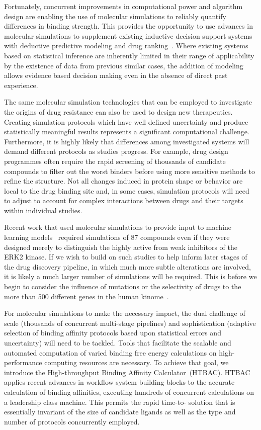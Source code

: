 Fortunately, concurrent improvements in computational power and algorithm
design are enabling the use of molecular simulations to reliably quantify
differences in binding strength. This provides the opportunity to use
advances in molecular simulations to supplement existing inductive decision
support systems with deductive predictive modeling and drug
ranking~\cite{Marias2011, Sloot2009}. Where existing systems based on
statistical inference are inherently limited in their range of applicability
by the existence of data from previous similar cases, the addition of
modeling allows evidence based decision making even in the absence of direct
past experience.

The same molecular simulation technologies that can be employed to
investigate the origins of drug resistance can also be used to design new
therapeutics. Creating simulation protocols which have well defined
uncertainty and produce statistically meaningful results represents a
significant computational challenge. Furthermore, it is highly likely that
differences among investigated systems will demand different protocols as
studies progress. For example, drug design programmes often require the rapid
screening of thousands of candidate compounds to filter out the worst binders
before using more sensitive methods to refine the structure. Not all changes
induced in protein shape or behavior are local to the drug binding site and,
in some cases, simulation protocols will need to adjust to account for
complex interactions between drugs and their targets within individual
studies.

Recent work that used molecular simulations to provide input to machine
learning models~\cite{Ash2017} required simulations of 87 compounds even if
they were designed merely to distinguish the highly active from weak
inhibitors of the ERK2 kinase. If we wish to build on such studies to help
inform later stages of the drug discovery pipeline, in which much more subtle
alterations are involved, it is likely a much larger number of simulations
will be required. This is before we begin to consider the influence of
mutations or the selectivity of drugs to the more than 500 different genes in
the human kinome~\cite{Li2016}.

For molecular simulations to make the necessary impact, the dual challenge of
scale (thousands of concurrent multi-stage pipelines) and sophistication
(adaptive selection of binding affinity protocols based upon statistical
errors and uncertainty) will need to be tackled. Tools that facilitate the
scalable and automated computation of varied binding free energy calculations
on high-performance computing resources are necessary. To achieve that goal,
we introduce the High-throughput Binding Affinity Calculator~(HTBAC). HTBAC
applies recent advances in workflow system building blocks to the accurate
calculation of binding affinities, executing hundreds of concurrent
calculations on a leadership class machine. This permits the rapid time-to-
solution that is essentially invariant of the size of candidate ligands as
well as the type and number of protocols concurrently employed.

